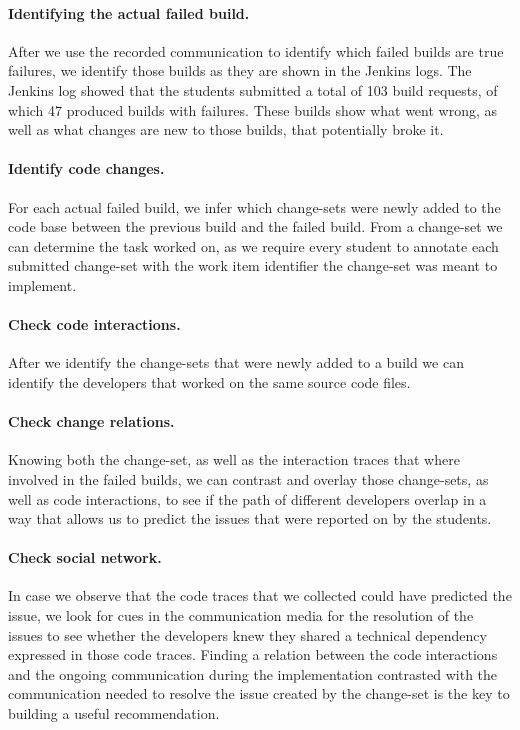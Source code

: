 \paragraph{Identifying the actual failed build.}
After we use the recorded communication to identify which failed builds are true failures, we identify those builds as they are shown in the Jenkins logs.
The Jenkins log showed that the students submitted a total of 103 build requests, of which 47 produced builds with failures. 
These builds show what went wrong, as well as what changes are new to those builds, that potentially broke it.

\paragraph{Identify code changes.}
For each actual failed build, we infer which change-sets were newly added to the code base between the previous build and the failed build.
From a change-set we can determine the task worked on, as we require every student to annotate each submitted change-set with the work item identifier the change-set was meant to implement.

\paragraph{Check code interactions.}
After we identify the change-sets that were newly added to a build we can identify the developers that worked on the same source code files.

\paragraph{Check change relations.}
Knowing both the change-set, as well as the interaction traces that where involved in the failed builds, we can contrast and overlay those change-sets, as well as code interactions, to see if the path of different developers overlap in a way that allows us to predict the issues that were reported on by the students.

\paragraph{Check social network.}
In case we observe that the code traces that we collected could have predicted the issue, we look for cues in the communication media for the resolution of the issues to see whether the developers knew they shared a technical dependency expressed in those code traces.
Finding a relation between the code interactions and the ongoing communication during the implementation contrasted with the communication needed to resolve the issue created by the change-set is the key to building a useful recommendation.

